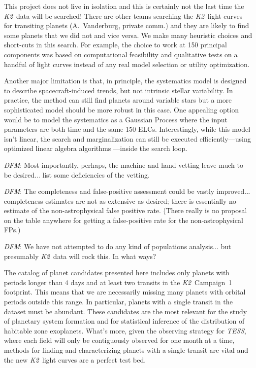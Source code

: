 \documentclass[12pt,preprint]{aastex}
\newcommand{\project}[1]{\textsl{#1}} %
\newcommand{\KT}{\project{K2}}
\newcommand{\tess}{\project{TESS}}
\newcommand{\todo}[3]{{\color{#2}\emph{#1}: #3}}
\newcommand{\dfmtodo}[1]{\todo{DFM}{red}{#1}}
\begin{document}
This project does not live in isolation and this is certainly not the last
time the \KT\ data will be searched!
There are other teams searching the \KT\ light curves for transiting planets
(A.~Vanderburg, private comm.) and they are likely to find some planets that
we did not and vice versa.
We make many heuristic choices and short-cuts in this search.
For example, the choice to work at 150 principal components was based on
computational feasibility and qualitative tests on a handful of light curves
instead of any real model selection or utility optimization.

Another major limitation is that, in principle, the systematics model is
designed to describe spacecraft-induced trends, but not intrinsic stellar
variability.
In practice, the method can still find planets around variable stars but a
more sophisticated model should be more robust in this case.
One appealing option would be to model the systematics as a Gaussian Process
where the input parameters are both time and the same 150 ELCs.
Interestingly, while this model isn't linear, the search and marginalization
can still be executed efficiently---using optimized linear algebra algorithms
\citep{fastgp}---inside the search loop.

\dfmtodo{
Most importantly, perhaps, the machine and hand vetting leave much to be desired...
list some deficiencies of the vetting.
}

\dfmtodo{
The completeness and false-positive assessment could be vastly improved...
completeness estimates are not as extensive as desired;
there is essentially no estimate of the non-astrophysical false positive rate.
(There really is no proposal on the table anywhere for getting a false-positive
rate for the non-astrophysical FPs.)
}

\dfmtodo{
We have not attempted to do any kind of populations analysis...
but presumably \KT\ data will rock this.  In what ways?
}

The catalog of planet candidates presented here includes only planets with
periods longer than 4 days and at least two transits in the \KT\ Campaign~1
footprint.
This means that we are necessarily missing many planets with orbital periods
outside  this range.
In particular, planets with a single transit in the dataset must be
abundant.
These candidates are the most relevant for the study of planetary system
formation and for statistical inference of the distribution of habitable zone
exoplanets.
What's more, given the observing strategy for \tess, where each field will
only be contiguously observed for one month at a time, methods for finding and
characterizing planets with a single transit are vital and the new \KT\ light
curves are a perfect test bed.
\end{document}
